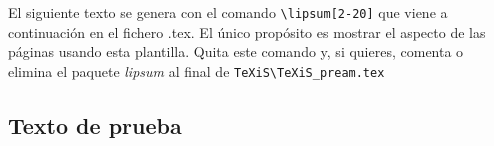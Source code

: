 El siguiente texto se genera con el comando \verb|\lipsum[2-20]| que viene a continuación en el fichero .tex. El único propósito es mostrar el aspecto de las páginas usando esta plantilla. Quita este comando y, si quieres, comenta o elimina el paquete \textit{lipsum} al final de \verb|TeXiS\TeXiS_pream.tex|

\subsection{Texto de prueba}


\lipsum[2-20]